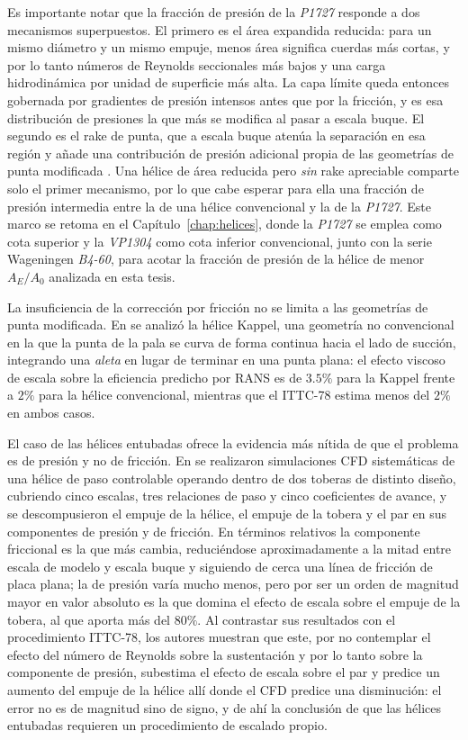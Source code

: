 Es importante notar que la fracción de presión de la \textit{P1727} responde a dos
mecanismos superpuestos. El primero es el área expandida reducida: para un mismo
diámetro y un mismo empuje, menos área significa cuerdas más cortas, y por lo
tanto números de Reynolds seccionales más bajos y una carga hidrodinámica por
unidad de superficie más alta. La capa límite queda entonces gobernada por
gradientes de presión intensos antes que por la fricción, y es esa distribución de
presiones la que más se modifica al pasar a escala buque. El segundo es el rake de
punta, que a escala buque atenúa la separación en esa región y añade una
contribución de presión adicional propia de las geometrías de punta modificada
\citep{Baltazar2021}. Una hélice de área reducida pero \emph{sin} rake apreciable
comparte solo el primer mecanismo, por lo que cabe esperar para ella una fracción
de presión intermedia entre la de una hélice convencional y la de la \textit{P1727}. Este
marco se retoma en el Capítulo~\ref{chap:helices}, donde la \textit{P1727} se emplea como
cota superior y la \textit{VP1304} como cota inferior convencional, junto con la serie Wageningen \textit{B4-60}, para acotar la fracción de presión de la hélice de menor
$A_E/A_0$ analizada en esta tesis.

La insuficiencia de la corrección por fricción no se limita a las geometrías de
punta modificada. En \citet{peravali2016} se analizó la hélice Kappel, una
geometría no convencional en la que la punta de la pala se curva de forma continua
hacia el lado de succión, integrando una \emph{aleta} en lugar de terminar en una
punta plana: el efecto viscoso de escala sobre la eficiencia predicho por RANS es
de $3.5\%$ para la Kappel frente a $2\%$ para la hélice convencional, mientras que
el ITTC-78 estima menos del $2\%$ en ambos casos.

El caso de las hélices entubadas ofrece la evidencia más nítida de que el problema es de presión y no
de fricción. En \citet{krasilnikov2016cfd} se realizaron simulaciones CFD
sistemáticas de una hélice de paso controlable operando dentro de dos toberas de
distinto diseño, cubriendo cinco escalas, tres relaciones de paso y cinco
coeficientes de avance, y se descompusieron el empuje de la hélice, el empuje de
la tobera y el par en sus componentes de presión y de fricción. En términos
relativos la componente friccional es la que más cambia, reduciéndose
aproximadamente a la mitad entre escala de modelo y escala buque y siguiendo de
cerca una línea de fricción de placa plana; la de presión varía mucho menos, pero
por ser un orden de magnitud mayor en valor absoluto es la que domina el efecto de
escala sobre el empuje de la tobera, al que aporta más del $80\%$. Al contrastar
sus resultados con el procedimiento ITTC-78, los autores muestran que este, por no
contemplar el efecto del número de Reynolds sobre la sustentación y por lo tanto
sobre la componente de presión, subestima el efecto de escala sobre el par y
predice un aumento del empuje de la hélice allí donde el CFD predice una
disminución: el error no es de magnitud sino de signo, y de ahí la conclusión de
que las hélices entubadas requieren un procedimiento de escalado propio.

